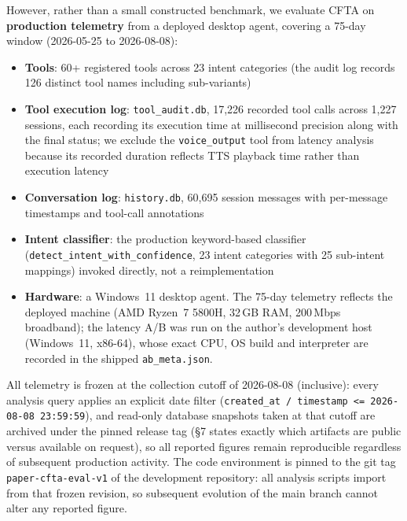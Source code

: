 \documentclass[numbered,mediumone,traditional]{oup-authoring-template}
\begin{document}
However, rather than a small constructed benchmark, we evaluate CFTA on \textbf{production telemetry} from a deployed desktop agent, covering a 75-day window (2026-05-25 to 2026-08-08):

\begin{itemize}
  \item \textbf{Tools}: 60+ registered tools across 23 intent categories (the audit log records 126 distinct tool names including sub-variants)
  \item \textbf{Tool execution log}: \texttt{tool\_audit.db}, 17,226 recorded tool calls across 1,227 sessions, each recording its execution time at millisecond precision along with the final status; we exclude the \texttt{voice\_output} tool from latency analysis because its recorded duration reflects TTS playback time rather than execution latency
  \item \textbf{Conversation log}: \texttt{history.db}, 60,695 session messages with per-message timestamps and tool-call annotations
  \item \textbf{Intent classifier}: the production keyword-based classifier (\texttt{detect\_intent\_with\_confidence}, 23 intent categories with 25 sub-intent mappings) invoked directly, not a reimplementation
  \item \textbf{Hardware}: a Windows~11 desktop agent. The 75-day telemetry reflects the deployed machine (AMD Ryzen~7 5800H, 32\,GB RAM, 200\,Mbps broadband); the latency A/B was run on the author's development host (Windows~11, x86-64), whose exact CPU, OS build and interpreter are recorded in the shipped \texttt{ab\_meta.json}.
\end{itemize}

All telemetry is frozen at the collection cutoff of 2026-08-08 (inclusive): every analysis query applies an explicit date filter (\texttt{created\_at / timestamp <= 2026-08-08 23:59:59}), and read-only database snapshots taken at that cutoff are archived under the pinned release tag (\S7 states exactly which artifacts are public versus available on request), so all reported figures remain reproducible regardless of subsequent production activity. The code environment is pinned to the git tag \texttt{paper-cfta-eval-v1} of the development repository: all analysis scripts import from that frozen revision, so subsequent evolution of the main branch cannot alter any reported figure.
\end{document}
